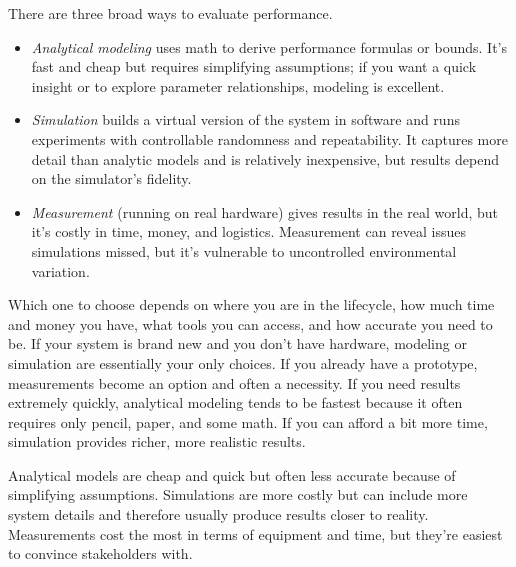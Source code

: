 There are three broad ways to evaluate performance.
\begin{itemize}
    \item \textit{Analytical modeling} uses math to derive performance formulas or bounds. It’s fast and cheap but requires simplifying assumptions; if you want a quick insight or to explore parameter relationships, modeling is excellent.
    \item \textit{Simulation} builds a virtual version of the system in software and runs experiments with controllable randomness and repeatability. It captures more detail than analytic models and is relatively inexpensive, but results depend on the simulator’s fidelity.
    \item \textit{Measurement} (running on real hardware) gives results in the real world, but it’s costly in time, money, and logistics. Measurement can reveal issues simulations missed, but it’s vulnerable to uncontrolled environmental variation.
\end{itemize}
Which one to choose depends on where you are in the lifecycle, how much time and money you have, what tools you can access, and how accurate you need to be.
If your system is brand new and you don’t have hardware, modeling or simulation are essentially your only choices. If you already have a prototype, measurements become an option and often a necessity.
If you need results extremely quickly, analytical modeling tends to be fastest because it often requires only pencil, paper, and some math. If you can afford a bit more time, simulation provides richer, more realistic results.

Analytical models are cheap and quick but often less accurate because of simplifying assumptions. Simulations are more costly but can include more system details and therefore usually produce results closer to reality. Measurements cost the most in terms of equipment and time, but they’re easiest to convince stakeholders with.

